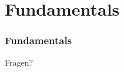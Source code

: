 \section{Fundamentals}

\begin{frame}
    \frametitle{Fundamentals}

    \begin{center}
        Fragen?
    \end{center}
\end{frame}